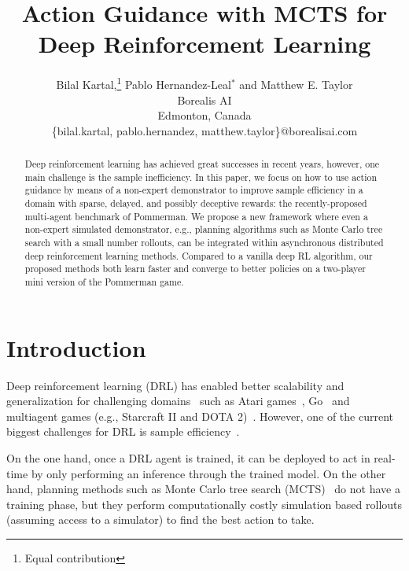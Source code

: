 \documentclass[letterpaper]{article}
\title{Action Guidance with MCTS for Deep Reinforcement Learning} %
\author{Bilal Kartal,\thanks{Equal contribution} Pablo Hernandez-Leal$^*$ and Matthew E. Taylor\\
Borealis AI\\
Edmonton, Canada\\
\{bilal.kartal, pablo.hernandez, matthew.taylor\}@borealisai.com
}
\begin{document}
\maketitle

\begin{abstract}

Deep reinforcement learning has achieved great successes in recent years, however, one main challenge is the sample inefficiency. In this paper, we focus on how to use action guidance by means of a non-expert demonstrator to improve sample efficiency in a domain with sparse, delayed, and possibly deceptive rewards: the recently-proposed multi-agent benchmark of Pommerman. We propose a new framework where even a non-expert simulated demonstrator, e.g., planning algorithms such as Monte Carlo tree search with a small number rollouts, can be integrated within asynchronous distributed deep reinforcement learning methods. Compared to a vanilla deep RL algorithm, our proposed methods both learn faster and converge to better policies on a two-player mini version of the Pommerman game.

\end{abstract}

\maketitle

\section{Introduction}


\noindent Deep reinforcement learning (DRL) has enabled better scalability and generalization for challenging domains~\cite{arulkumaran2017deep,li2017deep,hernandez2018multiagent} such as Atari games~\cite{mnih2015human}, Go~\cite{silver2016mastering} and multiagent games (e.g., Starcraft II and DOTA 2)~\cite{openfive}. However, one of the current biggest challenges for DRL is sample efficiency~\cite{yu2018towards}.


On the one hand, once a DRL agent is trained, it can be deployed to act in real-time by only performing an inference through the trained model. On the other hand, planning methods such as Monte Carlo tree search (MCTS)~\cite{browne2012survey} do not have a training phase, but they perform computationally costly simulation based rollouts (assuming access to a simulator) to find the best action to take. %
\end{document}
